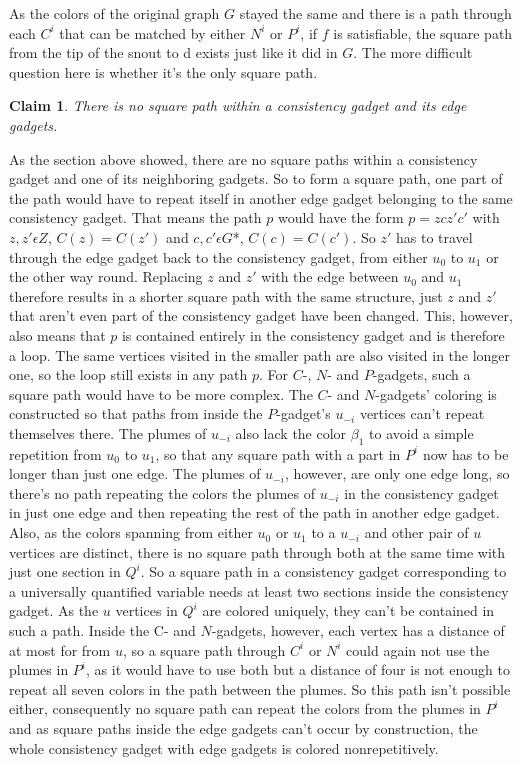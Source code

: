 \documentclass[12pt,a4paper]{article}
\newtheorem{claim}{Claim}
\begin{document}
As the colors of the original graph $G$ stayed the same and there is a path through each $C^i$ that can be matched by either $N^i$ or $P^i$, if $f$ is satisfiable, the square path from the tip of the snout to d exists just like it did in $G$. The more difficult question here is whether it's the only square path.
\newline
\begin{claim}
There is no square path within a consistency gadget and its edge gadgets.
\end{claim}
As the section above showed, there are no square paths within a consistency gadget and one of its neighboring gadgets. So to form a square path, one part of the path would have to repeat itself in another edge gadget belonging to the same consistency gadget. That means the path $p$ would have the form $p = zcz'c'$ with $z, z' \epsilon Z$, $C(z) = C(z')$ and $c, c' \epsilon G$*, $C(c) = C(c')$. So $z'$ has to travel through the edge gadget back to the consistency gadget, from either $u_0$ to $u_1$ or the other way round. Replacing $z$ and $z'$ with the edge between $u_0$ and $u_1$ therefore results in a shorter square path with the same structure, just $z$ and $z'$ that aren't even part of the consistency gadget have been changed. This, however, also means that $p$ is contained entirely in the consistency gadget and is therefore a loop. The same vertices visited in the smaller path are also visited in the longer one, so the loop still exists in any path $p$.
\newline 
For $C$-, $N$- and $P$-gadgets, such a square path would have to be more complex. The $C$- and $N$-gadgets' coloring is constructed so that paths from inside the $P$-gadget's $u_{-i}$ vertices can't repeat themselves there. The plumes of $u_{-i}$ also lack the color $\beta_1$ to avoid a simple repetition from $u_0$ to $u_1$, so that any square path with a part in $P^i$ now has to be longer than just one edge. The plumes of $u_{-i}$, however, are only one edge long, so there's no path repeating the colors the plumes of $u_{-i}$ in the consistency gadget in just one edge and then repeating the rest of the path in another edge gadget. Also, as the colors spanning from either $u_0$ or $u_1$ to a $u_{-i}$ and other pair of $u$ vertices are distinct, there is no square path through both at the same time with just one section in $Q^i$. So a square path in a consistency gadget corresponding to a universally quantified variable needs at least two sections inside the consistency gadget. As the $u$ vertices in $Q^i$ are colored uniquely, they can't be contained in such a path. Inside the C- and $N$-gadgets, however, each vertex has a distance of at most for from $u$, so a square path through $C^i$ or $N^i$ could again not use the plumes in $P^i$, as it would have to use both but a distance of four is not enough to repeat all seven colors in the path between the plumes. So this path isn't possible either, consequently no square path can repeat the colors from the plumes in $P^i$ and as square paths inside the edge gadgets can't occur by construction, the whole consistency gadget with edge gadgets is colored nonrepetitively.
\end{document}
